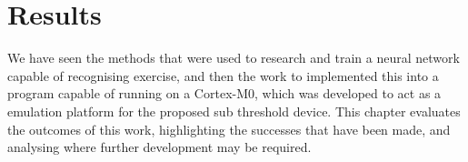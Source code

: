 \chapter{Results}

We have seen the methods that were used to research and train a neural network capable of recognising exercise, and then the work to implemented this into a program capable of running on a Cortex-M0, which was developed to act as a emulation platform for the proposed sub threshold device. This chapter evaluates the outcomes of this work, highlighting the successes that have been made, and analysing where further development may be required.





